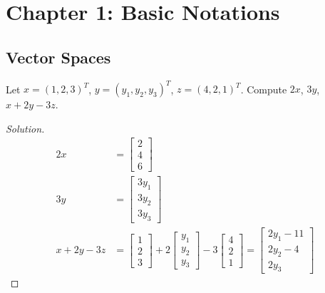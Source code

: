 \tableofcontents\pagebreak
\section{Chapter 1: Basic Notations}
\subsection{Vector Spaces}
\begin{problem}{1.1}
Let $x = (1, 2, 3)^T$, $y = (y_1, y_2, y_3)^T$, $z = (4, 2, 1)^T$. Compute $2x$, $3y$, $x + 2y - 3z$.
\end{problem}
\begin{proof}[Solution]
\begin{align*}
    2x &= \begin{bmatrix} 2 \\ 4 \\ 6 \end{bmatrix} \\
    3y &= \begin{bmatrix} 3y_{1} \\ 3y_{2} \\ 3y_{3} \end{bmatrix} \\
    x + 2y - 3z &= \begin{bmatrix} 1 \\ 2 \\ 3 \end{bmatrix} + 2\begin{bmatrix} y_1 \\ y_2 \\ y_3 \end{bmatrix} - 3\begin{bmatrix} 4 \\ 2 \\ 1 \end{bmatrix} = \begin{bmatrix} 2y_1 - 11 \\ 2y_2 - 4 \\ 2y_3 \end{bmatrix}
\end{align*}
\end{proof}